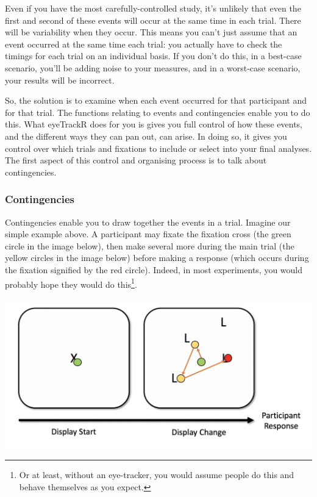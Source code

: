 \documentclass[]{book}
\let\rmarkdownfootnote\footnote%
\def\footnote{\protect\rmarkdownfootnote}
\begin{document}
Even if you have the most carefully-controlled study, it's unlikely that even the first and second of these events will occur at the same time in each trial. There will be variability when they occur. This means you can't just assume that an event occurred at the same time each trial: you actually have to check the timings for each trial on an individual basis. If you don't do this, in a best-case scenario, you'll be adding noise to your measures, and in a worst-case scenario, your results will be incorrect.

So, the solution is to examine when each event occurred for that participant and for that trial. The functions relating to events and contingencies enable you to do this. What eyeTrackR does for you is gives you full control of how these events, and the different ways they can pan out, can arise. In doing so, it gives you control over which trials and fixations to include or select into your final analyses. The first aspect of this control and organising process is to talk about contingencies.

\hypertarget{contingencies}{%
\subsubsection{Contingencies}\label{contingencies}}

Contingencies enable you to draw together the events in a trial. Imagine our simple example above. A participant may fixate the fixation cross (the green circle in the image below), then make several more during the main trial (the yellow circles in the image below) before making a response (which occurs during the fixation signified by the red circle). Indeed, in most experiments, you would probably hope they would do this\footnote{Or at least, without an eye-tracker, you would assume people do this and behave themselves as you expect.}.

\includegraphics[width=15.44in]{files/images/baseTrialFixes}
\end{document}
